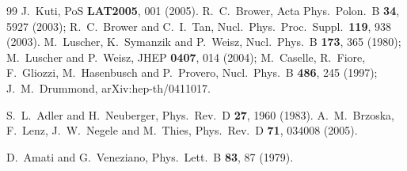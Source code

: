 \begin{thebibliography}{99}
J.~Kuti,
  PoS {\bf LAT2005}, 001 (2005).
  R.~C.~Brower,
  Acta Phys.\ Polon.\ B {\bf 34}, 5927 (2003);
    R.~C.~Brower and C.~I.~Tan,
  Nucl.\ Phys.\ Proc.\ Suppl.\  {\bf 119}, 938 (2003).
M.~Luscher, K.~Symanzik and P.~Weisz,
  Nucl.\ Phys.\ B {\bf 173}, 365 (1980);
M.~Luscher and P.~Weisz,
  JHEP {\bf 0407}, 014 (2004);
M.~Caselle, R.~Fiore, F.~Gliozzi, M.~Hasenbusch and P.~Provero,
  Nucl.\ Phys.\ B {\bf 486}, 245 (1997);
J.~M.~Drummond,
  arXiv:hep-th/0411017.




S.~L.~Adler and H.~Neuberger,
  Phys.\ Rev.\ D {\bf 27}, 1960 (1983).
  A.~M.~Brzoska, F.~Lenz, J.~W.~Negele and M.~Thies,
  Phys.\ Rev.\ D {\bf 71}, 034008 (2005).



D.~Amati and G.~Veneziano,
  Phys.\ Lett.\ B {\bf 83}, 87 (1979).

\end{thebibliography}
